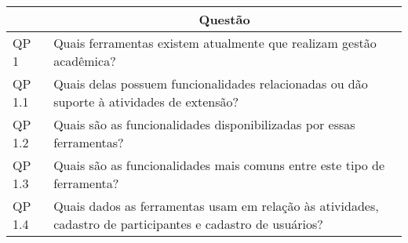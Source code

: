 \begin{table}[!htb]
  \centering
  \label{tab:research-questions}
  \footnotesize
  \begin{tabular}{l|p{9cm}}
    \bottomrule
    \rowcolor[rgb]{0.753,0.753,0.753} \multicolumn{1}{c|}{\textbf{ID}} & \multicolumn{1}{c}{\textbf{Questão}}                                                                 \\
    \hline
    \rowcolor[rgb]{0.898,0.898,0.898} QP 1                            & Quais ferramentas existem atualmente que realizam gestão acadêmica?                                          \\
    QP 1.1                                                            & Quais delas possuem funcionalidades relacionadas ou dão suporte à atividades de extensão?                                 \\
    \rowcolor[rgb]{0.898,0.898,0.898} QP 1.2                          & Quais são as funcionalidades disponibilizadas por essas ferramentas?                                                         \\
    QP 1.3                                                            & Quais são as funcionalidades mais comuns entre este tipo de ferramenta?                                          \\
    \rowcolor[rgb]{0.898,0.898,0.898} QP 1.4                          & Quais dados as ferramentas usam em relação às atividades, cadastro de participantes e cadastro de usuários? \\
    \toprule
  \end{tabular}
\end{table}